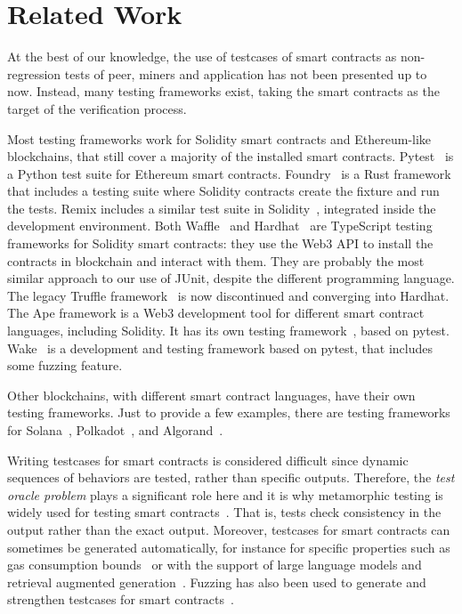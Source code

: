 \section{Related Work}\label{sec:related}

At the best of our knowledge, the use of testcases of smart contracts
as non-regression tests of peer, miners and application has not been
presented up to now. Instead, many testing frameworks exist, taking
the smart contracts as the target of the verification process.

Most testing frameworks work for Solidity smart contracts
and Ethereum-like blockchains, that still cover a majority of the
installed smart contracts.
Pytest~\citep{pytest} is a Python test suite for Ethereum smart contracts.
Foundry~\citep{foundry} is a Rust framework that includes a testing suite
where Solidity contracts create the fixture and run the tests.
Remix includes a similar test suite in Solidity~\citep{remixunittesting},
integrated inside the development environment.
Both Waffle~\citep{waffle} and Hardhat~\citep{hardhat} are TypeScript
testing frameworks for Solidity smart contracts:
they use the Web3 API to install the contracts in blockchain
and interact with them.
They are probably the most similar approach to our use of JUnit,
despite the different programming language.
The legacy Truffle framework~\citep{truffle} is now discontinued
and converging into Hardhat.
The Ape framework is a Web3 development tool for different smart contract
languages, including Solidity. It has its own testing
framework~\citep{apetesting}, based on pytest.
Wake~\citep{wake} is a development and testing framework based on pytest,
that includes some fuzzing feature.

Other blockchains, with different smart contract languages, have their own
testing frameworks.
Just to provide a few examples, there are testing frameworks
for Solana~\citep{rapidinnovation}, Polkadot~\citep{zombienet},
and Algorand~\citep{algokit}.

Writing testcases for smart contracts is considered difficult
since dynamic sequences of behaviors are tested, rather than
specific outputs. Therefore, the \emph{test oracle problem} plays
a significant role here and it is why metamorphic testing
is widely used for testing smart contracts~\citep{SunJZL25,VillanuevaSR25}.
That is, tests check consistency in the output rather than the exact output.
Moreover, testcases for smart contracts can
sometimes be generated automatically,
for instance for specific properties such as gas consumption
bounds~\citep{AlbertDDFG26} or with the support of large language models
and retrieval augmented generation~\citep{SbouiL26}.
Fuzzing has also been used to generate and strengthen testcases for
smart contracts~\citep{LahamiKMMR24,WongZNLCYLLW24}.

